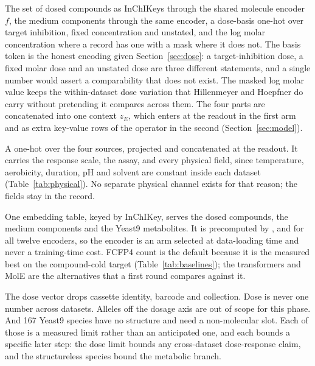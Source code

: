 The set of dosed compounds as InChIKeys through the shared molecule encoder $f$, the medium
components through the same encoder, a dose-basis one-hot over target inhibition, fixed
concentration and unstated, and the log molar concentration where a record has one with a
mask where it does not. The basis token is the honest encoding given Section~\ref{sec:dose}:
a target-inhibition dose, a fixed molar dose and an unstated dose are three different
statements, and a single number would assert a comparability that does not exist. The
masked log molar value keeps the within-dataset dose variation that Hillenmeyer and Hoepfner
do carry without pretending it compares across them. The four parts are concatenated into one
context $z_E$, which enters at the readout in the first arm and as extra key-value rows of
the operator in the second (Section~\ref{sec:model}).

A one-hot over the four sources, projected and concatenated at the readout. It carries the
response scale, the assay, and every physical field, since temperature, aerobicity, duration,
pH and solvent are constant inside each dataset (Table~\ref{tab:physical}). No separate
physical channel exists for that reason; the fields stay in the record.

One embedding table, keyed by InChIKey, serves the dosed compounds, the medium components and
the Yeast9 metabolites. It is precomputed by ,
 and  for all twelve
encoders, so the encoder is an arm selected at data-loading time and never a training-time
cost. FCFP4 count is the default because it is the measured best on the compound-cold target
(Table~\ref{tab:baselines}); the transformers and MolE are the alternatives that a first
round compares against it.

The dose vector drops cassette identity, barcode and collection. Dose is never one number
across datasets. Alleles off the dosage axis are out of scope for this phase. And 167 Yeast9
species have no structure and need a non-molecular slot. Each of those is a measured limit
rather than an anticipated one, and each bounds a specific later step: the dose limit bounds
any cross-dataset dose-response claim, and the structureless species bound the metabolic
branch.

